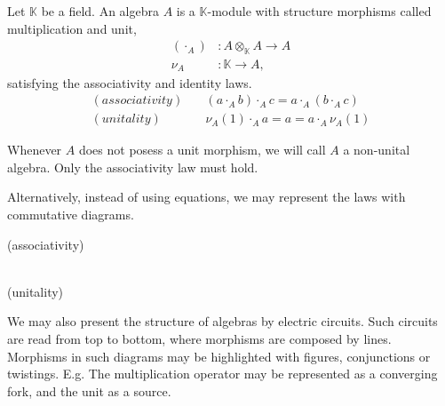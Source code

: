 \documentclass[../../thesis.tex]{subfiles}
\begin{document}
            \begin{definition}[Algebra]
                Let $\mathbb{K}$ be a field. An algebra $A$ is a $\mathbb{K}$-module with structure morphisms called multiplication and unit,
                \begin{align*}
                    (\cdot_A) & : A\otimes_{\mathbb{K}}A \rightarrow A \\
                    \nu_A & : \mathbb{K} \rightarrow A,
                \end{align*}
                satisfying the associativity and identity laws. 
                \begin{align*}
                    (associativity)\quad & (a \cdot_A b) \cdot_A c = a \cdot_A (b \cdot_A c) \\
                    (unitality)\quad & \nu_A(1) \cdot_A a = a = a \cdot_A \nu_A(1)
                \end{align*}
            \end{definition}
            \begin{remark}
                Whenever $A$ does not posess a unit morphism, we will call $A$ a non-unital algebra. Only the associativity law must hold.
            \end{remark}
            Alternatively, instead of using equations, we may represent the laws with commutative diagrams. 
            \begin{center}
                (associativity)\quad
                 \\
                (unitality) \quad
            \end{center}
            We may also present the structure of algebras by electric circuits. Such circuits are read from top to bottom, where morphisms are composed by lines. Morphisms in such diagrams may be highlighted with figures, conjunctions or twistings. E.g. The multiplication operator may be represented as a converging fork, and the unit as a source.
\end{document}
